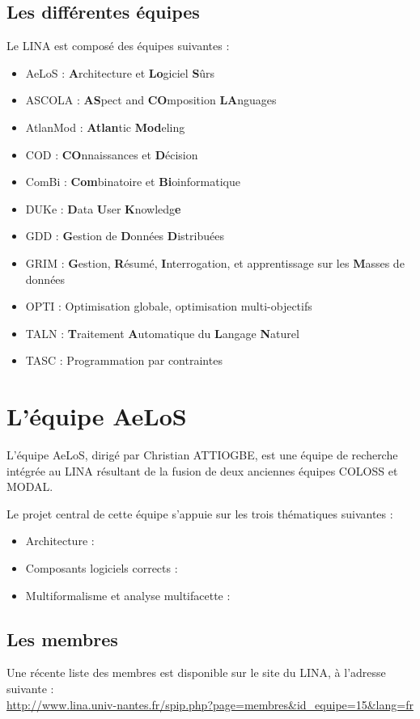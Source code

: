 \documentclass[12pt,a4paper]{report}
\begin{document}
\section{Les différentes équipes}
Le LINA est composé des équipes suivantes : 
\begin{itemize}
  \item AeLoS : \textbf{A}rchitecture et \textbf{Lo}giciel \textbf{S}ûrs
  \item ASCOLA : \textbf{AS}pect and \textbf{CO}mposition \textbf{LA}nguages
  \item AtlanMod : \textbf{Atlan}tic \textbf{Mod}eling 
  \item COD : \textbf{CO}nnaissances et \textbf{D}écision
  \item ComBi : \textbf{Com}binatoire et \textbf{Bi}oinformatique
  \item DUKe : \textbf{D}ata \textbf{U}ser \textbf{K}nowledg\textbf{e}
  \item GDD : \textbf{G}estion de \textbf{D}onnées \textbf{D}istribuées
  \item GRIM : \textbf{G}estion, \textbf{R}ésumé, \textbf{I}nterrogation, et apprentissage sur les \textbf{M}asses de données
  \item OPTI : Optimisation globale, optimisation multi-objectifs
  \item TALN : \textbf{T}raitement \textbf{A}utomatique du \textbf{L}angage \textbf{N}aturel
  \item TASC : Programmation par contraintes
\end{itemize}

\chapter{L'équipe AeLoS}	

L'équipe AeLoS, dirigé par Christian ATTIOGBE, est une équipe de recherche intégrée au LINA résultant de la fusion de deux anciennes équipes COLOSS et MODAL.

Le projet central de cette équipe s'appuie sur les trois thématiques suivantes :
\begin{itemize}[label=$\circ$]
  \item Architecture : 
  \item Composants logiciels corrects : 
  \item Multiformalisme et analyse multifacette : 
\end{itemize}

\section{Les membres}
Une récente liste des membres est disponible sur le site du LINA, à l'adresse suivante : \\
\url{http://www.lina.univ-nantes.fr/spip.php?page=membres&id_equipe=15&lang=fr}
\end{document}
